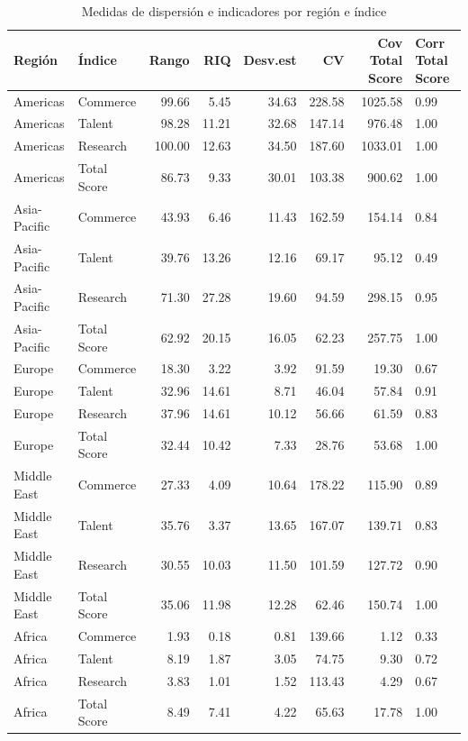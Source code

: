 \documentclass[
]{article}
\begin{document}
\renewcommand{\arraystretch}{1.3}
\begin{scriptsize}
\begin{longtable}[t]{llrrrrrl}
\caption{\label{tab:tabla3}Medidas de dispersión e indicadores por región e índice}\\
\toprule
Región & Índice & Rango & RIQ & Desv.est & CV & Cov Total Score & Corr Total Score\\
\midrule
Americas & Commerce & 99.66 & 5.45 & 34.63 & 228.58 & 1025.58 & 0.99\\
Americas & Talent & 98.28 & 11.21 & 32.68 & 147.14 & 976.48 & 1.00\\
Americas & Research & 100.00 & 12.63 & 34.50 & 187.60 & 1033.01 & 1.00\\
Americas & Total Score & 86.73 & 9.33 & 30.01 & 103.38 & 900.62 & 1.00\\
Asia-Pacific & Commerce & 43.93 & 6.46 & 11.43 & 162.59 & 154.14 & 0.84\\
\addlinespace
Asia-Pacific & Talent & 39.76 & 13.26 & 12.16 & 69.17 & 95.12 & 0.49\\
Asia-Pacific & Research & 71.30 & 27.28 & 19.60 & 94.59 & 298.15 & 0.95\\
Asia-Pacific & Total Score & 62.92 & 20.15 & 16.05 & 62.23 & 257.75 & 1.00\\
Europe & Commerce & 18.30 & 3.22 & 3.92 & 91.59 & 19.30 & 0.67\\
Europe & Talent & 32.96 & 14.61 & 8.71 & 46.04 & 57.84 & 0.91\\
\addlinespace
Europe & Research & 37.96 & 14.61 & 10.12 & 56.66 & 61.59 & 0.83\\
Europe & Total Score & 32.44 & 10.42 & 7.33 & 28.76 & 53.68 & 1.00\\
Middle East & Commerce & 27.33 & 4.09 & 10.64 & 178.22 & 115.90 & 0.89\\
Middle East & Talent & 35.76 & 3.37 & 13.65 & 167.07 & 139.71 & 0.83\\
Middle East & Research & 30.55 & 10.03 & 11.50 & 101.59 & 127.72 & 0.90\\
\addlinespace
Middle East & Total Score & 35.06 & 11.98 & 12.28 & 62.46 & 150.74 & 1.00\\
Africa & Commerce & 1.93 & 0.18 & 0.81 & 139.66 & 1.12 & 0.33\\
Africa & Talent & 8.19 & 1.87 & 3.05 & 74.75 & 9.30 & 0.72\\
Africa & Research & 3.83 & 1.01 & 1.52 & 113.43 & 4.29 & 0.67\\
Africa & Total Score & 8.49 & 7.41 & 4.22 & 65.63 & 17.78 & 1.00\\
\bottomrule
\end{longtable}

\end{scriptsize}\renewcommand{\arraystretch}{1}
\end{document}
